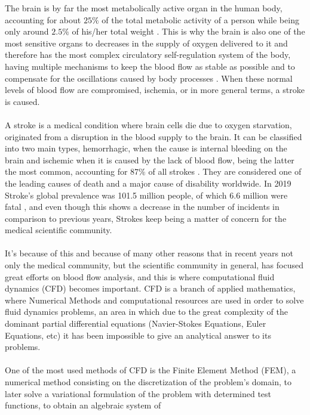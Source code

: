 \documentclass[12pt,letterpaper]{article}
\begin{document}
The brain is by far the most metabolically active organ in the human body, 
accounting for about $25\%$ of the total metabolic activity of a person
while being only around $2.5\%$ of his/her total weight \cite{Ischemia}.
This is why the brain is also one of the most sensitive organs to decreases 
in the supply of oxygen delivered to it and therefore has the most complex 
circulatory self-regulation system of the body,  having multiple mechanisms 
to keep the blood flow as stable as possible and to compensate for the 
oscillations caused by body processes \cite{AnatoFisio}. When these normal
levels of blood flow are compromised,  ischemia,  or in more general terms, 
a stroke is caused.\\~\\
A stroke is a medical condition where brain cells die due to oxygen starvation,
originated from a disruption in the blood supply to the brain. It can
be classified into two main types, hemorrhagic, when the cause is internal bleeding
on the brain and ischemic when it is caused by the lack of blood flow,  being the 
latter the most common,  accounting for $87\%$ of all strokes \cite{johns_hopkins_medicine}.
They are considered one of the leading causes of death and a major cause
of disability worldwide. In 2019 Stroke's global prevalence was 101.5 million 
people,  of which 6.6 million were fatal \cite{burden},  and even though this shows 
a decrease in the number of incidents in comparison to previous years,  Strokes keep being a
matter of concern for the medical scientific community.\\~\\
It’s because of this and because of many other reasons that in recent years 
not only the medical community,  but the scientific community in general,  
has focused great efforts on blood flow analysis,  and this is where computational 
fluid dynamics (CFD) becomes important. CFD is a branch of applied mathematics,  
where Numerical Methods and computational resources are used in order to solve 
fluid dynamics problems,  an area in which due to the great complexity of the 
dominant partial differential equations (Navier-Stokes Equations,  Euler Equations, 
etc) it has been impossible to give an analytical answer to its problems.\\~\\
One of the most used methods of CFD is the Finite Element Method (FEM), a numerical method
consisting on the discretization of the problem's domain, to later solve a variational 
formulation of the problem with determined test functions, to obtain an algebraic system of 
\end{document}
